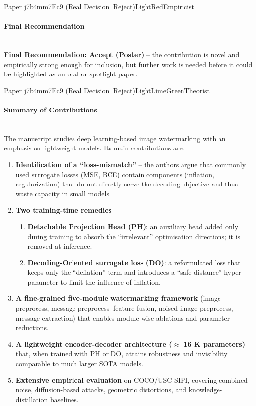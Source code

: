 \documentclass{article} %
\begin{document}
\begin{reviewbox}{\href{https://openreview.net/forum?id=j7b4mm7Ec9}{Paper j7b4mm7Ec9 (Real Decision: Reject)}}{LightRed}{Empiricist}
\paragraph{Final Recommendation}
\leavevmode\\[0.1em]
\textbf{Final Recommendation:} \textbf{Accept (Poster)} – the contribution is novel and empirically strong enough for inclusion, but further work is needed before it could be highlighted as an oral or spotlight paper.

\end{reviewbox}

\begin{reviewbox}{\href{https://openreview.net/forum?id=j7b4mm7Ec9}{Paper j7b4mm7Ec9 (Real Decision: Reject)}}{LightLimeGreen}{Theorist}
\scriptsize
\paragraph{Summary of Contributions}
\leavevmode\\[0.1em]
The manuscript studies deep learning-based image watermarking with an emphasis on lightweight models. Its main contributions are:

\begin{enumerate}[leftmargin=0.5em, itemsep=0pt, topsep=0pt]
    \item \textbf{Identification of a “loss-mismatch”} – the authors argue that commonly used surrogate losses (MSE, BCE) contain components (inflation, regularization) that do not directly serve the decoding objective and thus waste capacity in small models.
    \item \textbf{Two training-time remedies} – 
    \begin{enumerate}[leftmargin=1em, itemsep=0pt, topsep=0pt]
        \item \textbf{Detachable Projection Head (PH)}: an auxiliary head added only during training to absorb the “irrelevant” optimisation directions; it is removed at inference.
        \item \textbf{Decoding-Oriented surrogate loss (DO)}: a reformulated loss that keeps only the “deflation” term and introduces a “safe-distance” hyper-parameter to limit the influence of inflation.
    \end{enumerate}
    \item \textbf{A fine-grained five-module watermarking framework} (image-preprocess, message-preprocess, feature-fusion, noised-image-preprocess, message-extraction) that enables module-wise ablations and parameter reductions.
    \item \textbf{A lightweight encoder-decoder architecture ($\approx$ 16 K parameters)} that, when trained with PH or DO, attains robustness and invisibility comparable to much larger SOTA models.
    \item \textbf{Extensive empirical evaluation} on COCO/USC-SIPI, covering combined noise, diffusion-based attacks, geometric distortions, and knowledge-distillation baselines.
\end{enumerate}


\end{reviewbox}
\end{document}
